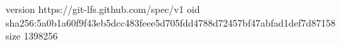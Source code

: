 version https://git-lfs.github.com/spec/v1
oid sha256:5a0b1a60f9f43eb5dcc483feee5d705fdd4788d72457bf47abfad1def7d87158
size 1398256

